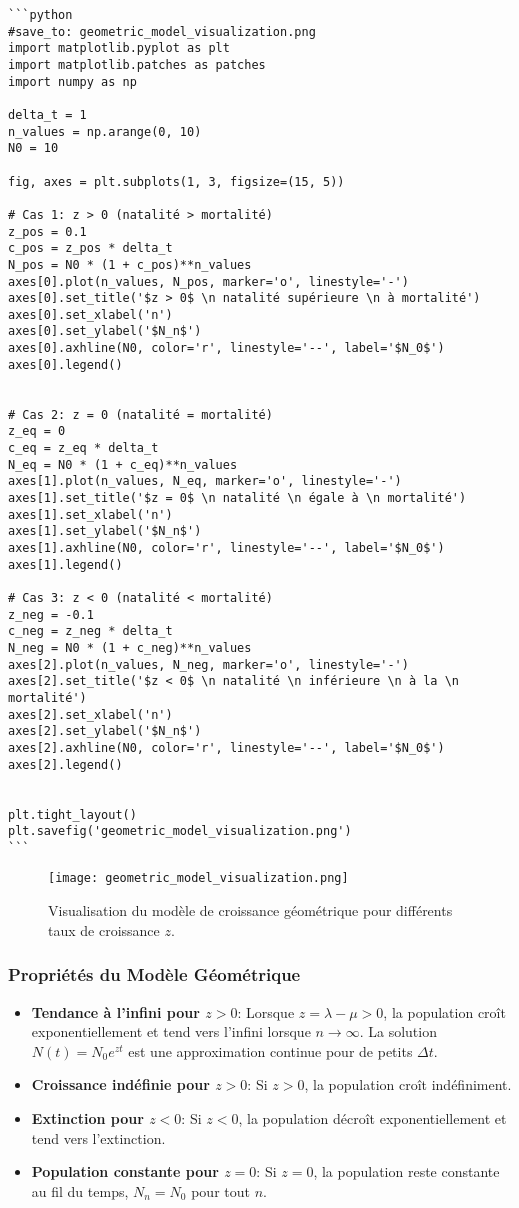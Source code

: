 \documentclass{article}
\begin{document}
\begin{verbatim}
```python
#save_to: geometric_model_visualization.png
import matplotlib.pyplot as plt
import matplotlib.patches as patches
import numpy as np

delta_t = 1
n_values = np.arange(0, 10)
N0 = 10

fig, axes = plt.subplots(1, 3, figsize=(15, 5))

# Cas 1: z > 0 (natalité > mortalité)
z_pos = 0.1
c_pos = z_pos * delta_t
N_pos = N0 * (1 + c_pos)**n_values
axes[0].plot(n_values, N_pos, marker='o', linestyle='-')
axes[0].set_title('$z > 0$ \n natalité supérieure \n à mortalité')
axes[0].set_xlabel('n')
axes[0].set_ylabel('$N_n$')
axes[0].axhline(N0, color='r', linestyle='--', label='$N_0$')
axes[0].legend()


# Cas 2: z = 0 (natalité = mortalité)
z_eq = 0
c_eq = z_eq * delta_t
N_eq = N0 * (1 + c_eq)**n_values
axes[1].plot(n_values, N_eq, marker='o', linestyle='-')
axes[1].set_title('$z = 0$ \n natalité \n égale à \n mortalité')
axes[1].set_xlabel('n')
axes[1].set_ylabel('$N_n$')
axes[1].axhline(N0, color='r', linestyle='--', label='$N_0$')
axes[1].legend()

# Cas 3: z < 0 (natalité < mortalité)
z_neg = -0.1
c_neg = z_neg * delta_t
N_neg = N0 * (1 + c_neg)**n_values
axes[2].plot(n_values, N_neg, marker='o', linestyle='-')
axes[2].set_title('$z < 0$ \n natalité \n inférieure \n à la \n mortalité')
axes[2].set_xlabel('n')
axes[2].set_ylabel('$N_n$')
axes[2].axhline(N0, color='r', linestyle='--', label='$N_0$')
axes[2].legend()


plt.tight_layout()
plt.savefig('geometric_model_visualization.png')
```
\end{verbatim}

\begin{figure}[h]
    \centering
    \texttt{[image: geometric\_model\_visualization.png]}
    \caption{Visualisation du modèle de croissance géométrique pour différents taux de croissance $z$.}
    \label{fig:geometric_model_visualization}
\end{figure}


\subsubsection{Propriétés du Modèle Géométrique}

\begin{itemize}
    \item \textbf{Tendance à l'infini pour $z > 0$}: Lorsque $z = \lambda - \mu > 0$, la population croît exponentiellement et tend vers l'infini lorsque $n \to \infty$. La solution $N(t) = N_0 e^{zt}$ est une approximation continue pour de petits $\Delta t$.
    \item \textbf{Croissance indéfinie pour $z > 0$}: Si $z > 0$, la population croît indéfiniment.
    \item \textbf{Extinction pour $z < 0$}: Si $z < 0$, la population décroît exponentiellement et tend vers l'extinction.
    \item \textbf{Population constante pour $z = 0$}: Si $z = 0$, la population reste constante au fil du temps, $N_n = N_0$ pour tout $n$.
\end{itemize}
\end{document}
